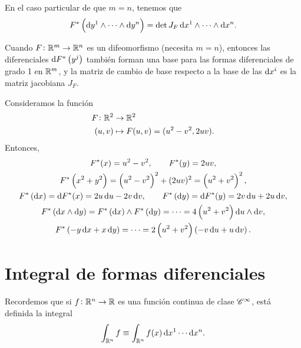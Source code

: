 \begin{obs}
    En el caso particular de que $m=n$, tenemos que
    \[
        F^\ast \left( \dif y^1 \wedge \cdots \wedge \dif y^n \right) = \det J_F \dif x^1 \wedge \cdots \wedge \dif x^n.
    \]
\end{obs}

\begin{prop}
    Cuando $F \colon \mathbb{R}^m \to \mathbb{R}^n$ es un difeomorfismo (necesita $m=n$), entonces las diferenciales $\dif F^\ast \left( y^j \right)$
    tambi\'en forman una base para las formas diferenciales de grado 1 en $\mathbb{R}^m$, y la matriz de cambio de base respecto a la base de las
    $\dif x^i$ es la matriz jacobiana $J_F$.
\end{prop}

\begin{example}
    Consideramos la función
    \[
        \begin{aligned}
            F \colon \mathbb{R}^2 &\to \mathbb{R}^2 \\
            (u,v) &\mapsto F(u,v) = (u^2 - v^2, 2uv).
        \end{aligned}
    \]
    Entonces,
    \begin{gather*}
        F^\ast(x) = u^2 - v^2, \qquad F^\ast(y) = 2uv, \\
        F^\ast \left( x^2 + y^2 \right) = \left(u^2 - v^2\right)^2 + (2uv)^2 = \left(u^2 +v^2\right)^2, \\
        F^\ast\left( \dif x \right) = \dif F^\ast(x) = 2u\dif u - 2v\dif v,
        \qquad
        F^\ast\left( \dif y \right) = \dif F^\ast (y) = 2v \dif u + 2u \dif v, \\
        F^\ast\left( \dif x \wedge \dif y \right) = F^\ast\left( \dif x \right) \wedge F^\ast\left( \dif y \right) = \cdots =
        4 \left( u^2 + v^2 \right) \dif u \wedge \dif v, \\
        F^\ast\left( -y\dif x + x \dif y\right) = \cdots = 2 \left( u^2 + v^2 \right) \left( -v \dif u + u \dif v \right).
    \end{gather*}
\end{example}

\section{Integral de formas diferenciales}

\begin{obs}
    Recordemos que si $f \colon \mathbb{R}^n \to \mathbb{R}$ es una función continua de clase $\mathscr{C}^\infty$, está definida la integral
    \[
        \int_{\real^n} f \equiv \int_{\real^n} f(x) \dif x^1 \cdots \dif x^n.
    \]
\end{obs}

